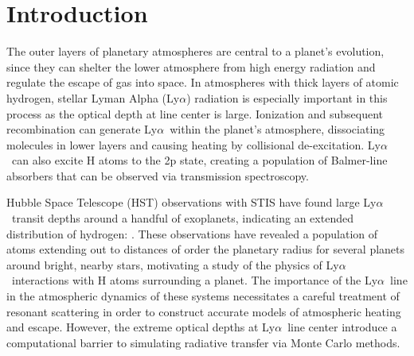 \documentclass{aastex63}
\newcommand\lya{Ly$\alpha$\ }
\begin{document}
\section{Introduction} 
\label{sec:intro}

The outer layers of planetary atmospheres are central to a planet's evolution, since they can shelter the lower atmosphere from high energy radiation and regulate the escape of gas into space. In atmospheres with thick layers of atomic hydrogen, stellar Lyman Alpha (Ly$\alpha$) radiation is especially important in this process as the optical depth at line center is large. Ionization and subsequent recombination can generate \lya within the planet's atmosphere, dissociating molecules in lower layers and causing heating by collisional de-excitation. \lya can also excite H atoms to the 2p state, creating a population of Balmer-line absorbers that can be observed via transmission spectroscopy.



Hubble Space Telescope (HST) observations with STIS have found large \lya transit depths around a handful of exoplanets, indicating an extended distribution of hydrogen: \citet{2003Natur.422..143V, 2012A&A...543L...4L, 2012A&A...547A..18E, 2015Natur.522..459E,  2017A&A...597A..26B, 2017A&A...599L...3B, 2017A&A...602A.106B, 2018A&A...620A.147B, 2019AJ....158...50W, 2019EPSC...13.1928L, 2020ApJ...888L..21G,2021arXiv210309864B}. These observations have revealed a population of atoms extending out to distances of order the planetary radius for several planets around bright, nearby stars, motivating a study of the physics of \lya interactions with H atoms surrounding a planet. The importance of the \lya line in the atmospheric dynamics of these systems necessitates a careful treatment of resonant scattering in order to construct accurate models of atmospheric heating and escape. However, the extreme optical depths at \lya line center introduce a computational barrier to simulating radiative transfer via Monte Carlo methods.
\end{document}
